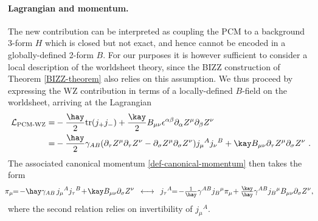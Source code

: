 \documentclass[12pt]{article}
\numberwithin{equation}{section}
\begin{document}
\paragraph{Lagrangian and momentum.} The new contribution can be interpreted as coupling the PCM to a background 3-form $H$ which is closed but not exact, and hence cannot be encoded in a globally-defined 2-form $B$. For our purposes it is however sufficient to consider a local description of the worldsheet theory, since the BIZZ construction of Theorem \ref{BIZZ-theorem} also relies on this assumption. We thus proceed by expressing the WZ contribution in terms of a locally-defined $B$-field on the worldsheet, arriving at the Lagrangian
\begin{equation}
\begin{aligned}
\mathcal{L}_{\text{PCM-WZ}}=&-\frac{\hay}{2} \mathrm{tr}(j_{+}j_{-})+\frac{\kay}{2}B_{\mu\nu} \epsilon^{\alpha\beta}\partial_{\alpha}Z^{\mu}\partial_{\beta}Z^{\nu}
\\
=&-\frac{\hay}{2}\gamma_{AB}(\partial_{\tau}Z^{\mu}\partial_{\tau}Z^{\nu}-\partial_{\sigma}Z^{\mu}\partial_{\sigma}Z^{\nu})j_{\mu}{}^{A}j_{\nu}{}^{B}+\kay B_{\mu\nu}\partial_{\tau}Z^{\mu}\partial_{\sigma}Z^{\nu} \,\, .
\end{aligned}
\end{equation}
The associated canonical momentum \eqref{def-canonical-momentum} then takes the form
\begin{equation}\label{PCM-WZ-canonical-momentum}
\!\!\!\pi_{\mu}\!\!=\! -\hay \gamma_{AB} \, j_{\mu}{}^{A}j_{\tau}{}^{B}\!+\!\kay B_{\mu\nu}\partial_{\sigma}Z^{\nu}
\,\,\, \longleftrightarrow \,\,\, 
j_{\tau}{}^{A}\!\!=\!-\tfrac{1}{\hay}\gamma^{AB}j_{B}{}^{\mu}\pi_{\mu}\!+\tfrac{\kay}{\hay}\gamma^{AB}j_{B}{}^{\mu}B_{\mu\nu}\partial_{\sigma}Z^{\nu}  ,
\end{equation}
where the second relation relies on invertibility of $j_{\mu}{}^{A}$.
\end{document}
